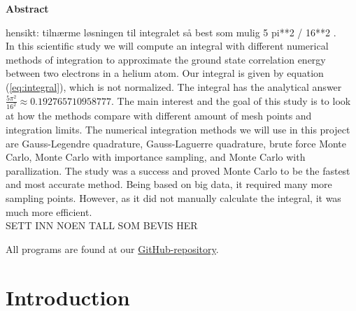 \documentclass{article}
\begin{document}
\vspace{1cm}


\begin{center}

{\Large\textbf{Abstract}} \label{sec:Abstract}

\end{center}

\vspace{5mm}

hensikt: tilnærme løsningen til integralet så best som mulig 5 pi**2 / 16**2 . \\

In this scientific study we will compute an integral with different numerical methods of integration to approximate the ground state correlation energy between two electrons in a helium atom. Our integral is given by equation (\ref{eq:integral}), which is not normalized. The integral has the analytical answer $\frac{5 \pi^2}{16^2} \approx 0.192765710958777$. The main interest and the goal of this study is to look at how the methods compare with different amount of mesh points and integration limits. The numerical integration methods we will use in this project are Gauss-Legendre quadrature, Gauss-Laguerre quadrature, brute force Monte Carlo, Monte Carlo with importance sampling, and Monte Carlo with parallization. The study was a success and proved Monte Carlo to be the fastest and most accurate method. Being based on big data, it required many more sampling points. However, as it did not manually calculate the integral, it was much more efficient. \\

SETT INN NOEN TALL SOM BEVIS HER

All programs are found at our \href{https://github.com/Erikbgram/Fys3150}{GitHub-repository}. \\


\newpage


\vspace{1cm}

\tableofcontents

\vspace{1cm}

\vspace{1cm}

\section{Introduction} \label{sec:Introduction}
\end{document}
